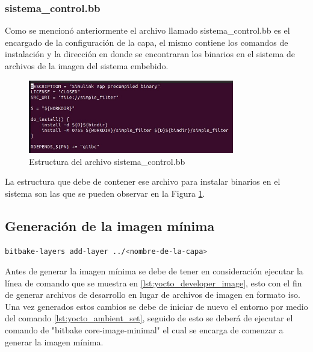 \subsubsection{sistema\_control.bb}

Como se mencionó anteriormente el archivo llamado sistema\_control.bb es el encargado de la configuración de la capa, el mismo contiene los comandos de instalación y la dirección en donde se encontraran los binarios en el sistema de archivos de la imagen del sistema embebido.

\begin{figure}[h!]
    \centering
    \includegraphics[width=0.8\textwidth]{fig/especifico_2/bbfilestructure.jpg}
    \caption{Estructura del archivo sistema\_control.bb}
    \label{fig:estructura_archivo_bb}
\end{figure}

La estructura que debe de contener ese archivo para instalar binarios en el sistema son las que se pueden observar en la Figura \ref{fig:estructura_archivo_bb}.

\subsection{Generación de la imagen mínima}\label{subsec:generacion_imagen_minima}

\begin{lstlisting}[language=bash, caption={Generar archivos de desarrollador, Yocto }, label=lst:yocto_developer_image]
    bitbake-layers add-layer ../<nombre-de-la-capa>
\end{lstlisting}

Antes de generar la imagen mínima se debe de tener en consideración ejecutar la línea de comando que se muestra en \ref{lst:yocto_developer_image}, esto con el fin de generar archivos de desarrollo en lugar de archivos de imagen en formato iso. Una vez generados estos cambios se debe de iniciar de nuevo el entorno por medio del comando \ref{lst:yocto_ambient_set}, seguido de esto se deberá de ejecutar el comando de "bitbake core-image-minimal" el cual se encarga de comenzar a generar la imagen mínima.

